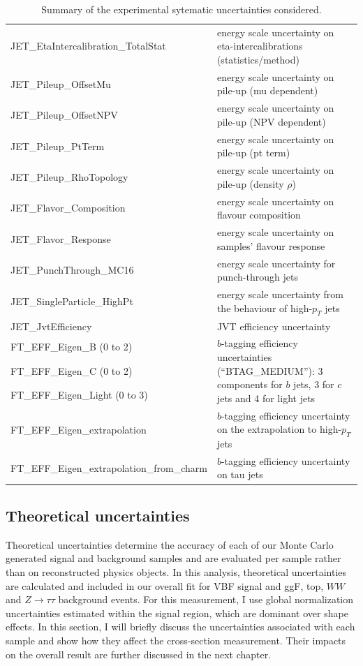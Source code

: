 \begin{table}
{\begin{tabular}{l|l}
  JET\_EtaIntercalibration\_TotalStat & energy scale uncertainty on eta-intercalibrations (statistics/method) \\
  JET\_Pileup\_OffsetMu                & energy scale uncertainty on pile-up (mu dependent)    \\
  JET\_Pileup\_OffsetNPV               & energy scale uncertainty on pile-up (NPV dependent)   \\
  JET\_Pileup\_PtTerm                  & energy scale uncertainty on pile-up (pt term)         \\
  JET\_Pileup\_RhoTopology             & energy scale uncertainty on pile-up (density $\rho$)  \\
  JET\_Flavor\_Composition             & energy scale uncertainty on flavour composition       \\
  JET\_Flavor\_Response                & energy scale uncertainty on samples' flavour response \\
  JET\_PunchThrough\_MC16              & energy scale uncertainty for punch-through jets       \\
  JET\_SingleParticle\_HighPt          & energy scale uncertainty from the behaviour of high-$p_T$ jets \\
  JET\_JvtEfficiency & JVT efficiency uncertainty      \\
  FT\_EFF\_Eigen\_B (0 to 2) & \multirow{3}{*}{\parbox{11cm}{$b$-tagging efficiency uncertainties (``BTAG\_MEDIUM''): 3 components for $b$ jets, 3 for $c$ jets and 4 for light jets}} \\
  FT\_EFF\_Eigen\_C (0 to 2)                 & \\
  FT\_EFF\_Eigen\_Light (0 to 3)             & \\
  FT\_EFF\_Eigen\_extrapolation              & $b$-tagging efficiency uncertainty on the extrapolation to high-$p_T$ jets\\
  FT\_EFF\_Eigen\_extrapolation\_from\_charm & $b$-tagging efficiency uncertainty on tau jets \\
\hline\hline     
\end{tabular}
}
\caption{Summary of the experimental sytematic uncertainties considered.}
\label{tab:expSyst}
\end{table}

\subsection{Theoretical uncertainties}
Theoretical uncertainties determine the accuracy of each of our Monte Carlo generated signal and background samples and are evaluated per sample rather than on reconstructed physics objects. In this analysis, theoretical uncertainties are calculated and included in our overall fit for VBF signal and ggF, top, $WW$ and $Z\rightarrow\tau\tau$ background events. For this measurement, I use global normalization uncertainties estimated within the signal region, which are dominant over shape effects. In this section, I will briefly discuss the uncertainties associated with each sample and show how they affect the cross-section measurement. Their impacts on the overall result are further discussed in the next chapter.  

